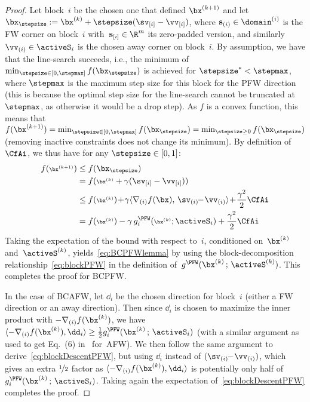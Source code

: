\documentclass{article}
\begin{document}
\begin{proof}
Let block~$i$ be the chosen one that defined $\bx^{(k+1)}$ and let $\bx_\stepsize := \bx^{(k)}+\stepsize(\sv_{[i]}-\vv_{[i]})$, where $\mathbf{s}_{(i)} \in \domain^{(i)}$ is the FW corner on block~$i$ with~$\mathbf{s}_{[i]} \in \R^m$ its zero-padded version, and similarly $\vv_{(i)} \in \activeS_i$ is the chosen away corner on block~$i$. By assumption, we have that the line-search succeeds, i.e., the minimum of $\min_{\stepsize \in [0,\stepmax]} f(\bx_\stepsize)$ is achieved for $\stepsize^* < \stepmax$, where $\stepmax$ is the maximum step size for this block for the PFW direction (this is because the optimal step size for the line-search cannot be truncated at $\stepmax$, as otherwise it would be a drop step). As $f$ is a convex function, this means that $f(\bx^{(k+1)}) = \min_{\stepsize \in [0,\stepmax]} f(\bx_\stepsize) = \min_{\stepsize \geq 0}  f(\bx_\stepsize)$ (removing inactive constraints does not change its minimum). By definition of~$\CfAi$, we thus have for any $\stepsize \in [0,1]$:
\begin{align}
f({\scriptstyle \bx^{(k+1)}}) &\leq  f(\bx_\stepsize) \notag \\
&= f({\scriptstyle \bx^{(k)}} + \gamma (\sv_{[i]} - \vv_{[i]})) \notag \\
& \leq f({\scriptstyle \bx^{(k)}})\! +\! \gamma \langle  \nabla_{(i)} f(\bx) , \, \sv_{(i)} \!\! -\! \vv_{(i)}\rangle \!+\! \frac{\gamma^2}{2}\CfAi \notag \\
&=  f({\scriptstyle \bx^{(k)}}) - \gamma \, g_i^\PFW({\scriptstyle \bx^{(k)}} ;  \activeS_i) + \frac{\gamma^2}{2}\CfAi \!\!\!\!\!\!. \label{eq:blockDescentPFW}
\end{align}
Taking the expectation of the bound with respect to~$i$, conditioned on~$\bx^{(k)}$ and~$\activeS^{(k)}$, yields~\eqref{eq:BCPFWlemma} by using the block-decomposition relationship~\eqref{eq:blockPFW} in the definition of~$g^\PFW(\bx^{(k)} \,;\, \activeS^{(k)})$. This completes the proof for BCPFW.

In the case of BCAFW, let $\dd_i$ be the chosen direction for block~$i$ (either a FW direction or an away direction). Then since $\dd_i$ is chosen to maximize the inner product with $-\nabla_{(i)} f(\bx^{(k)})$, we have
$\langle -\nabla_{(i)} f(\bx^{(k)}), \dd_i \rangle \geq \frac{1}{2} g_i^\PFW(\bx^{(k)} \, ; \, \activeS_i)$ (with a similar argument as used to get Eq.~(6) in~\citet{LacosteJulien2015linearFW} for~AFW). We then follow the same argument to derive~\eqref{eq:blockDescentPFW}, but using $\dd_i$ instead of $(\sv_{(i)} \!\! -\! \vv_{(i)})$, which gives an extra $\nicefrac{1}{2}$ factor as $\langle -\nabla_{(i)} f(\bx^{(k)}), \dd_i \rangle$ is potentially only half of $g_i^\PFW(\bx^{(k)} \, ; \, \activeS_i)$. Taking again the expectation of~\eqref{eq:blockDescentPFW} completes the proof.
\end{proof}
\end{document}
